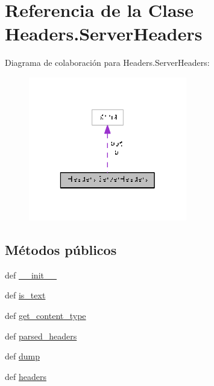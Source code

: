 \hypertarget{class_headers_1_1_server_headers}{\section{Referencia de la Clase Headers.\-Server\-Headers}
\label{class_headers_1_1_server_headers}
}


Diagrama de colaboración para Headers.\-Server\-Headers\-:\nopagebreak
\begin{figure}[H]
\begin{center}
\leavevmode
\includegraphics[width=196pt]{class_headers_1_1_server_headers__coll__graph}
\end{center}
\end{figure}
\subsection*{Métodos públicos}
\begin{DoxyCompactItemize}
\item 
def \hyperlink{class_headers_1_1_server_headers_a456a736b904107eddd7eba61ad716919}{\-\_\-\-\_\-init\-\_\-\-\_\-}
\item 
def \hyperlink{class_headers_1_1_server_headers_a7eb46fb6fc725c07fea7c9d59b185508}{is\-\_\-text}
\item 
def \hyperlink{class_headers_1_1_server_headers_ac1fe5a40cb91c4525b4fac1bb16b97c8}{get\-\_\-content\-\_\-type}
\item 
def \hyperlink{class_headers_1_1_server_headers_a7572d026e3212c61e6d384a4bcb4c8e7}{parsed\-\_\-headers}
\item 
def \hyperlink{class_headers_1_1_server_headers_a731227c073d6a6226d7e74b7c38e98ca}{dump}
\item 
def \hyperlink{class_headers_1_1_server_headers_af9b5c13f2416bdcd185452e209eff2da}{headers}
\end{DoxyCompactItemize}
